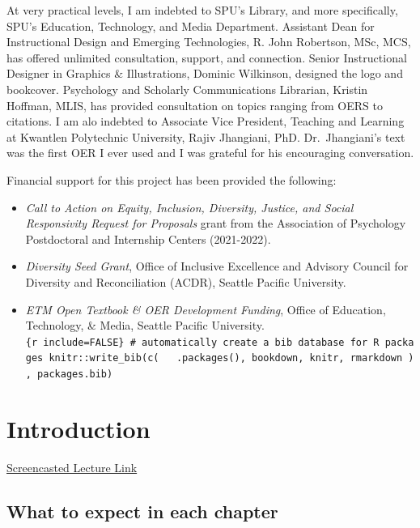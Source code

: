 \documentclass[
  11pt,
]{book}
\providecommand{\tightlist}{%
  \setlength{\itemsep}{0pt}\setlength{\parskip}{0pt}}
\begin{document}
At very practical levels, I am indebted to SPU's Library, and more specifically, SPU's Education, Technology, and Media Department. Assistant Dean for Instructional Design and Emerging Technologies, R. John Robertson, MSc, MCS, has offered unlimited consultation, support, and connection. Senior Instructional Designer in Graphics \& Illustrations, Dominic Wilkinson, designed the logo and bookcover. Psychology and Scholarly Communications Librarian, Kristin Hoffman, MLIS, has provided consultation on topics ranging from OERS to citations. I am alo indebted to Associate Vice President, Teaching and Learning at Kwantlen Polytechnic University, Rajiv Jhangiani, PhD. Dr.~Jhangiani's text \citeyearpar{jhangiani_research_2019} was the first OER I ever used and I was grateful for his encouraging conversation.

Financial support for this project has been provided the following:

\begin{itemize}
\tightlist
\item
  \emph{Call to Action on Equity, Inclusion, Diversity, Justice, and Social Responsivity Request for Proposals} grant from the Association of Psychology Postdoctoral and Internship Centers (2021-2022).
\item
  \emph{Diversity Seed Grant}, Office of Inclusive Excellence and Advisory Council for Diversity and Reconciliation (ACDR), Seattle Pacific University.
\item
  \emph{ETM Open Textbook \& OER Development Funding}, Office of Education, Technology, \& Media, Seattle Pacific University.\texttt{\{r\ include=FALSE\}\ \#\ automatically\ create\ a\ bib\ database\ for\ R\ packages\ knitr::write\_bib(c(\ \ \ .packages(),\ \textquotesingle{}bookdown\textquotesingle{},\ \textquotesingle{}knitr\textquotesingle{},\ \textquotesingle{}rmarkdown\textquotesingle{}\ ),\ \textquotesingle{}packages.bib\textquotesingle{})}
\end{itemize}

\hypertarget{ReCintro}{%
\chapter{Introduction}\label{ReCintro}}

\href{https://spu.hosted.panopto.com/Panopto/Pages/Viewer.aspx?pid=cc9b7c0d-e5c3-4e4e-a469-acf7013ee761}{Screencasted Lecture Link}

\hypertarget{what-to-expect-in-each-chapter}{%
\section{What to expect in each chapter}\label{what-to-expect-in-each-chapter}}
\end{document}
